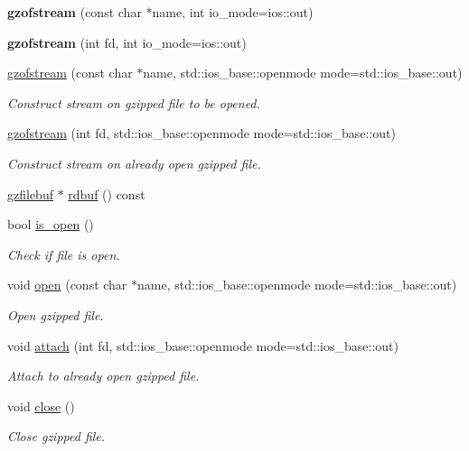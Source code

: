 \begin{DoxyCompactItemize}
\item 
\hypertarget{classgzofstream_aad6a405bc9ecfd82cc0861a15e4a6983}{{\bfseries gzofstream} (const char $\ast$name, int io\+\_\+mode=ios\+::out)}\label{classgzofstream_aad6a405bc9ecfd82cc0861a15e4a6983}

\item 
\hypertarget{classgzofstream_a5291a0c4c0e7f6f18ca72ae98f4e4d40}{{\bfseries gzofstream} (int fd, int io\+\_\+mode=ios\+::out)}\label{classgzofstream_a5291a0c4c0e7f6f18ca72ae98f4e4d40}

\item 
\hyperlink{classgzofstream_a4334d31aab99f8c9c2277b672a55c78f}{gzofstream} (const char $\ast$name, std\+::ios\+\_\+base\+::openmode mode=std\+::ios\+\_\+base\+::out)
\begin{DoxyCompactList}\small\item\em Construct stream on gzipped file to be opened. \end{DoxyCompactList}\item 
\hyperlink{classgzofstream_aa94d0c8414119a52f2a7f42aa0440941}{gzofstream} (int fd, std\+::ios\+\_\+base\+::openmode mode=std\+::ios\+\_\+base\+::out)
\begin{DoxyCompactList}\small\item\em Construct stream on already open gzipped file. \end{DoxyCompactList}\item 
\hyperlink{classgzfilebuf}{gzfilebuf} $\ast$ \hyperlink{classgzofstream_abe4562c3d07138dc31694580bf897c7c}{rdbuf} () const 
\item 
bool \hyperlink{classgzofstream_acb1c9c6dccaf41bc5e44c2263ea48de3}{is\+\_\+open} ()
\begin{DoxyCompactList}\small\item\em Check if file is open. \end{DoxyCompactList}\item 
void \hyperlink{classgzofstream_aee3eb31f07eda7f5ad1f60d59ea4b239}{open} (const char $\ast$name, std\+::ios\+\_\+base\+::openmode mode=std\+::ios\+\_\+base\+::out)
\begin{DoxyCompactList}\small\item\em Open gzipped file. \end{DoxyCompactList}\item 
void \hyperlink{classgzofstream_a95b76eaecd03b6cbf53d2f4b1c867439}{attach} (int fd, std\+::ios\+\_\+base\+::openmode mode=std\+::ios\+\_\+base\+::out)
\begin{DoxyCompactList}\small\item\em Attach to already open gzipped file. \end{DoxyCompactList}\item 
void \hyperlink{classgzofstream_a59e8b01e1c9741085f18ca456c4b8f54}{close} ()
\begin{DoxyCompactList}\small\item\em Close gzipped file. \end{DoxyCompactList}\end{DoxyCompactItemize}



